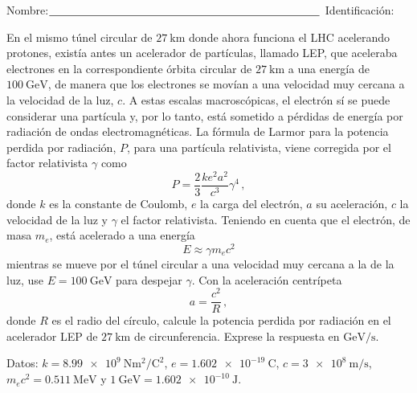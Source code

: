 \documentclass[12pt, a4paper]{article}
\begin{document}
\vspace*{-2cm}
Nombre:$\underline{\hspace{8.5cm}}$ Identificación: \hrulefill

\quad

\begin{exercise}[ID=lep, tags={banco}]
En el mismo túnel circular de $\qty{27}{\kilo\meter}$ donde ahora funciona el LHC acelerando protones, existía antes un acelerador de partículas, llamado LEP, que aceleraba electrones en la correspondiente órbita circular de $\qty{27}{\kilo\meter}$ a una energía de $\qty{100}{\giga\electronvolt}$, de manera que los electrones se movían a una velocidad muy cercana a la velocidad de la luz, $c$. A estas escalas macroscópicas, el electrón sí se puede considerar una partícula y, por lo tanto, está sometido a pérdidas de energía por radiación de ondas electromagnéticas. La fórmula de Larmor para la potencia perdida por radiación, $P$, para una partícula relativista, viene corregida por el factor relativista $\gamma$ como
\begin{equation}
    P = \frac{2}{3} \frac{k e^2 a^2}{c^3}\gamma^4\,,
    \label{eq:larmor}
\end{equation}
donde $k$ es la constante de Coulomb, $e$ la carga del electrón, $a$ su aceleración, $c$ la velocidad de la luz y $\gamma$ el factor relativista. Teniendo en cuenta que el electrón, de masa $m_e$, está acelerado a una energía
\begin{equation}
    E \approx \gamma m_e c^2
\end{equation}
mientras se mueve por el túnel circular a una velocidad muy cercana a la de la luz, use $E=\qty{100}{\giga\electronvolt}$ para despejar $\gamma$. Con la aceleración centrípeta
\begin{equation}
    a = \frac{c^2}{R}\,,
\end{equation}
donde $R$ es el radio del círculo, calcule la potencia perdida por radiación en el acelerador LEP de $\qty{27}{\kilo\meter}$ de circunferencia. Exprese la respuesta en $\unit{\giga\electronvolt\per\second}$.

Datos: $k=\qty{8.99e9}{\newton\meter\squared\per\coulomb\squared}$, $e=\qty{1.602e-19}{\coulomb}$, $c=\qty{3e8}{\meter\per\second}$, $m_e c^2=\qty{0.511}{\mega\electronvolt}$ y $\qty{1}{\giga\electronvolt}=\qty{1.602e-10}{\joule}$.
\end{exercise}
\end{document}

